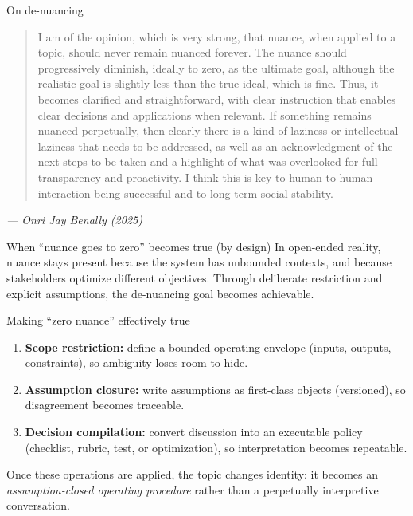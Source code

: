 \documentclass[presentation,aspectratio=169,11pt]{beamer}
\newcommand{\KeyTerm}[1]{\textbf{#1}}
\begin{document}
\begin{frame}{On de-nuancing}
\justifying
\small
\begin{quote}
I am of the opinion, which is very strong, that nuance, when applied to a topic, should never remain nuanced forever. The nuance should progressively diminish, ideally to zero, as the ultimate goal, although the realistic goal is slightly less than the true ideal, which is fine. Thus, it becomes clarified and straightforward, with clear instruction that enables clear decisions and applications when relevant. If something remains nuanced perpetually, then clearly there is a kind of laziness or intellectual laziness that needs to be addressed, as well as an acknowledgment of the next steps to be taken and a highlight of what was overlooked for full transparency and proactivity. I think this is key to human-to-human interaction being successful and to long-term social stability.
\end{quote}
\vspace{0.35em}
\hfill\textit{--- Onri Jay Benally (2025)}
\end{frame}

\begin{frame}{When ``nuance goes to zero'' becomes true (by design)}
\justifying
In open-ended reality, nuance stays present because the system has unbounded contexts, and because stakeholders optimize different objectives. Through deliberate restriction and explicit assumptions, the de-nuancing goal becomes achievable.

\vspace{0.75em}
\begin{block}{Making ``zero nuance'' effectively true}
\justifying
\begin{enumerate}
  \item \KeyTerm{Scope restriction:} define a bounded operating envelope (inputs, outputs, constraints), so ambiguity loses room to hide.
  \item \KeyTerm{Assumption closure:} write assumptions as first-class objects (versioned), so disagreement becomes traceable.
  \item \KeyTerm{Decision compilation:} convert discussion into an executable policy (checklist, rubric, test, or optimization), so interpretation becomes repeatable.
\end{enumerate}
\end{block}

\vspace{0.5em}
\small
Once these operations are applied, the topic changes identity: it becomes an \emph{assumption-closed operating procedure} rather than a perpetually interpretive conversation.
\end{frame}
\end{document}
